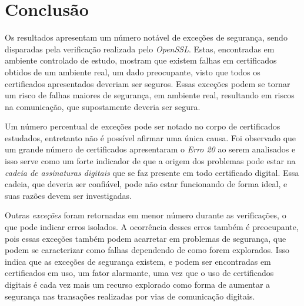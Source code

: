 

\chapter[Conclusão]{Conclusão}

	Os resultados apresentam um número notável de exceções de segurança, sendo disparadas pela verificação realizada pelo \textit{OpenSSL}. Estas, encontradas em ambiente controlado de estudo, mostram que existem falhas em certificados obtidos de um ambiente real, um dado preocupante, visto que todos os certificados apresentados deveriam ser seguros. Essas exceções podem se tornar um risco de falhas maiores de segurança, em ambiente real, resultando em riscos na comunicação, que supostamente deveria ser segura.

	Um número percentual de exceções pode ser notado no corpo de certificados estudados, entretanto não é possível afirmar uma única causa. Foi observado que um grande número de certificados apresentaram o \textit{Erro 20} ao serem analisados e isso serve como um forte indicador de que a origem dos problemas pode estar na \textit{cadeia de assinaturas digitais} que se faz presente em todo certificado digital. Essa cadeia, que deveria ser confiável, pode não estar funcionando de forma ideal, e suas razões devem ser investigadas.

	Outras \textit{exceções} foram retornadas em menor número durante as verificações, o que pode indicar erros isolados. A ocorrência desses erros também é preocupante, pois essas exceções também podem acarretar em problemas de segurança, que podem se caracterizar como falhas dependendo de como forem explorados. Isso indica que as exceções de segurança existem, e podem ser encontradas em certificados em uso, um fator alarmante, uma vez que o uso de certificados digitais é cada vez mais um recurso explorado como forma de aumentar a segurança nas transações realizadas por vias de comunicação digitais.
